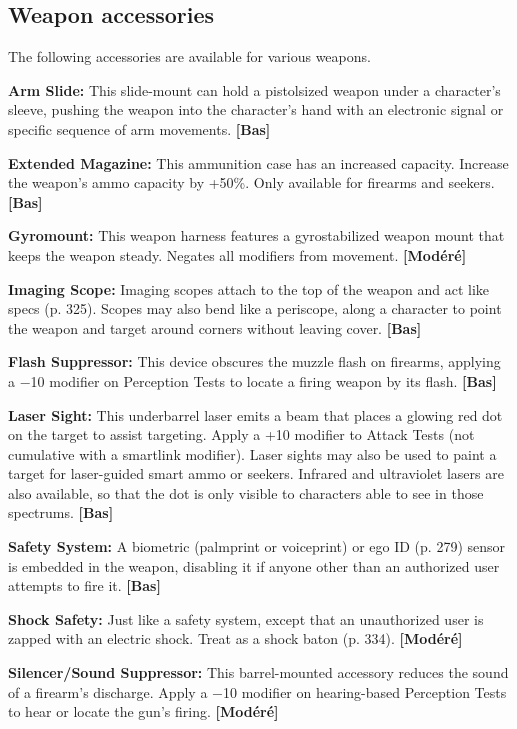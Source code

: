 {{\subsection{Weapon accessories} \label{sec:weapon-accessories} 

The following accessories are available for various weapons. 

\textbf{Arm Slide:} This slide-mount can hold a pistolsized weapon under a character’s sleeve, pushing the weapon into the character’s hand with an electronic signal or specific sequence of arm movements. \textbf{[Bas]} 

\textbf{Extended Magazine:} This ammunition case has an increased capacity. Increase the weapon’s ammo capacity by +50\%. Only available for firearms and seekers. \textbf{[Bas]} 

\textbf{Gyromount:} This weapon harness features a gyrostabilized weapon mount that keeps the weapon steady. Negates all modifiers from movement. \textbf{[Modéré]} 

\textbf{Imaging Scope:} Imaging scopes attach to the top of the weapon and act like specs (p. 325). Scopes may also bend like a periscope, along a character to point the weapon and target around corners without leaving cover. \textbf{[Bas]} 

\textbf{Flash Suppressor:} This device obscures the muzzle flash on firearms, applying a $-$10 modifier on Perception Tests to locate a firing weapon by its flash. \textbf{[Bas]} 

\textbf{Laser Sight:} This underbarrel laser emits a beam that places a glowing red dot on the target to assist targeting. Apply a +10 modifier to Attack Tests (not cumulative with a smartlink modifier). Laser sights may also be used to paint a target for laser-guided smart ammo or seekers. Infrared and ultraviolet lasers are also available, so that the dot is only visible to characters able to see in those spectrums. \textbf{[Bas]} 

\textbf{Safety System:} A biometric (palmprint or voiceprint) or ego ID (p. 279) sensor is embedded in the weapon, disabling it if anyone other than an authorized user attempts to fire it. \textbf{[Bas]} 

\textbf{Shock Safety:} Just like a safety system, except that an unauthorized user is zapped with an electric shock. Treat as a shock baton (p. 334). \textbf{[Modéré]} 

\textbf{Silencer/Sound Suppressor:} This barrel-mounted accessory reduces the sound of a firearm’s discharge. Apply a $-$10 modifier on hearing-based Perception Tests to hear or locate the gun’s firing. \textbf{[Modéré]} 

}}

